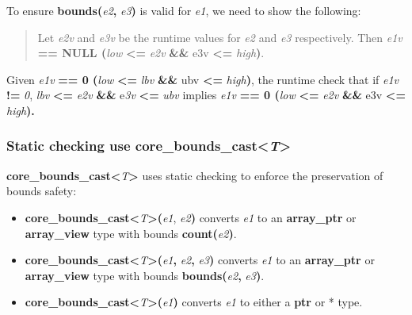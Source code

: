 To ensure \textbf{bounds(}\emph{e2}\textbf{,} \emph{e3}\textbf{)} is
valid for \emph{e1}, we need to show the following:

\begin{quote}
Let \emph{e2v} and \emph{e3v} be the runtime values for \emph{e2} and
\emph{e3} respectively. Then \emph{e1v} \textbf{== NULL
\textbar{}\textbar{} (}\emph{low} \textbf{\textless{}=} \emph{e2v}
\textbf{\&\&} e3v \textbf{\textless{}=} \emph{high}\textbf{)}.
\end{quote}

Given \emph{e1v} \textbf{== 0 \textbar{}\textbar{} (}\emph{low}
\textbf{\textless{}=} \emph{lbv} \textbf{\&\&} ubv \textbf{\textless{}=}
\emph{high}\textbf{)}, the runtime check that if \emph{e1v} \textbf{!=}
\emph{0}, \emph{lbv} \textbf{\textless{}=} \emph{e2v} \textbf{\&\&}
e\emph{3v} \textbf{\textless{}=} \emph{ubv} implies \emph{e1v}
\textbf{== 0 \textbar{}\textbar{} (}\emph{low} \textbf{\textless{}=}
\emph{e2v} \textbf{\&\&} e3v \textbf{\textless{}=}
\emph{high}\textbf{).}

\subsubsection{\texorpdfstring{\protect\hypertarget{ux5fToc437460799}{}{\protect\hypertarget{ux5fToc440445480}{}{\protect\hypertarget{ux5fToc440449262}{}{\protect\hypertarget{ux5fToc440551912}{}{}}}}Static
checking use
core\_bounds\_cast\textless{}\emph{T}\textgreater{}}{Static checking use core\_bounds\_cast\textless{}T\textgreater{}}}\label{static-checking-use-coreux5fboundsux5fcastt}

\textbf{core\_bounds\_cast\textless{}}\emph{T}\textbf{\textgreater{}}
uses static checking to enforce the preservation of bounds safety:

\begin{itemize}
\item
  \textbf{core\_bounds\_cast\textless{}}\emph{T}\textbf{\textgreater{}(}\emph{e1},
  \emph{e2}\textbf{)} converts \emph{e1} to an \textbf{array\_ptr} or
  \textbf{array\_view} type with bounds
  \textbf{count(}\emph{e2}\textbf{)}.
\item
  \textbf{core\_bounds\_cast\textless{}}\emph{T}\textbf{\textgreater{}(}\emph{e1}\textbf{,}
  \emph{e2}\textbf{,} \emph{e3}\textbf{)} converts \emph{e1} to an
  \textbf{array\_ptr} or \textbf{array\_view} type with bounds
  \textbf{bounds(}\emph{e2}\textbf{,} \emph{e3}\textbf{)}.
\item
  \textbf{core\_bounds\_cast\textless{}}\emph{T}\textbf{\textgreater{}(}\emph{e1}\textbf{)}
  converts \emph{e1} to either a \textbf{ptr} or * type.
\end{itemize}

